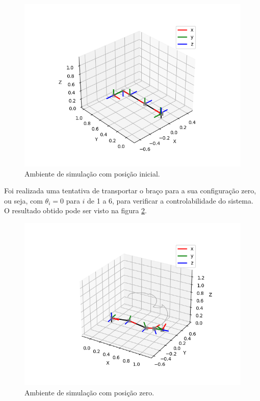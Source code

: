 \begin{figure}[h]
    \caption{Ambiente de simulação com posição inicial.}

    \begin{centering}
        \includegraphics[width=0.8\columnwidth]{images/resultados/pos_inicial.png} 
    \par\end{centering}

    \label{fig:pos-inicial}
\end{figure}

Foi realizada uma tentativa de transportar o braço para a sua configuração zero, 
ou seja, com $\theta_i=0$ para $i$ de 1 a 6, para verificar a controlabilidade do sistema. 
O resultado obtido pode ser visto na figura \ref{fig:pos-zero}.

\begin{figure}[h]
    \caption{Ambiente de simulação com posição zero.}

    \begin{centering}
        \includegraphics[width=0.8\columnwidth]{images/resultados/pos_zero.png} 
    \par\end{centering}

    \label{fig:pos-zero}
\end{figure}


